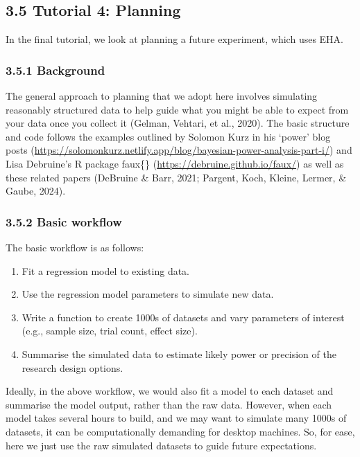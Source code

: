 \documentclass[
  man, donotrepeattitle,floatsintext]{apa6}
\providecommand{\tightlist}{%
  \setlength{\itemsep}{0pt}\setlength{\parskip}{0pt}}
\begin{document}
\subsection{3.5 Tutorial 4: Planning}\label{tutorial-4-planning}

In the final tutorial, we look at planning a future experiment, which uses EHA.

\subsubsection{3.5.1 Background}\label{background}

The general approach to planning that we adopt here involves simulating reasonably structured data to help guide what you might be able to expect from your data once you collect it (Gelman, Vehtari, et al., 2020).
The basic structure and code follows the examples outlined by Solomon Kurz in his `power' blog posts (\url{https://solomonkurz.netlify.app/blog/bayesian-power-analysis-part-i/}) and Lisa Debruine's R package faux\{\} (\url{https://debruine.github.io/faux/}) as well as these related papers (DeBruine \& Barr, 2021; Pargent, Koch, Kleine, Lermer, \& Gaube, 2024).

\subsubsection{3.5.2 Basic workflow}\label{basic-workflow}

The basic workflow is as follows:

\begin{enumerate}
\def\labelenumi{\arabic{enumi}.}
\tightlist
\item
  Fit a regression model to existing data.
\item
  Use the regression model parameters to simulate new data.
\item
  Write a function to create 1000s of datasets and vary parameters of interest (e.g., sample size, trial count, effect size).
\item
  Summarise the simulated data to estimate likely power or precision of the research design options.
\end{enumerate}

Ideally, in the above workflow, we would also fit a model to each dataset and summarise the model output, rather than the raw data. However, when each model takes several hours to build, and we may want to simulate many 1000s of datasets, it can be computationally demanding for desktop machines. So, for ease, here we just use the raw simulated datasets to guide future expectations.
\end{document}
